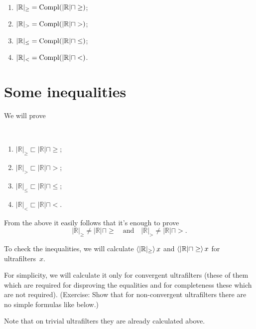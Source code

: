 \begin{cor}
~
\begin{enumerate}
\item $|\mathbb{R}|_{\geq} = \operatorname{Compl}(|\mathbb{R}| \sqcap \geq)$;
\item $|\mathbb{R}|_{>} = \operatorname{Compl}(|\mathbb{R}| \sqcap >)$;
\item $|\mathbb{R}|_{\leq} = \operatorname{Compl}(|\mathbb{R}| \sqcap \leq)$;
\item $|\mathbb{R}|_{<} = \operatorname{Compl}(|\mathbb{R}| \sqcap <)$.
\end{enumerate}
\end{cor}

\section{Some inequalities}

We will prove

\begin{thm}
~
\begin{enumerate}
\item $|\mathbb{R}|_{\geq} \sqsubset |\mathbb{R}| \sqcap \geq$;
\item $|\mathbb{R}|_{>} \sqsubset |\mathbb{R}| \sqcap >$;
\item $|\mathbb{R}|_{\leq} \sqsubset |\mathbb{R}| \sqcap \leq$;
\item $|\mathbb{R}|_{<} \sqsubset |\mathbb{R}| \sqcap <$.
\end{enumerate}
\end{thm}

From the above it easily follows that it's enough to prove
\[ |\mathbb{R}|_{\geq} \ne |\mathbb{R}| \sqcap \geq \quad \text{and} \quad
|\mathbb{R}|_{>} \ne |\mathbb{R}| \sqcap >. \]


To check the inequalities, we will calculate $\left\langle |\mathbb{R}|_{\geq}\right\rangle x$ and
$\left\langle |\mathbb{R}| \sqcap \geq\right\rangle x$ for ultrafilters~$x$.

For simplicity, we will calculate it only for convergent ultrafilters (these
of them which are required for disproving the equalities and for completeness
these which are not required). (Exercise: Show that for non-convergent
ultrafilters there are no simple formulas like below.)

Note that on trivial ultrafilters they are already calculated above.

